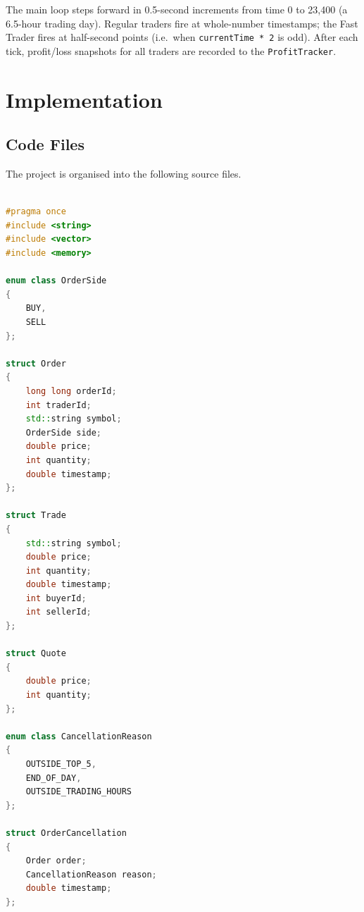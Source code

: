 \documentclass[11pt, a4paper]{article}
\begin{document}
The main loop steps forward in 0.5-second increments from time 0 to 23,400 (a 6.5-hour trading day). Regular traders fire at whole-number timestamps; the Fast Trader fires at half-second points (i.e.\ when \texttt{currentTime * 2} is odd). After each tick, profit/loss snapshots for all traders are recorded to the \texttt{ProfitTracker}.

\section{Implementation}

\subsection{Code Files}

The project is organised into the following source files.

\begin{tcolorbox}[codefile, title={\texttt{Common.h}}]
\begin{lstlisting}[language=C++, numbers=none, caption={}]

#pragma once
#include <string>
#include <vector>
#include <memory>

enum class OrderSide
{
    BUY,
    SELL
};

struct Order
{
    long long orderId;
    int traderId;
    std::string symbol;
    OrderSide side;
    double price;
    int quantity;
    double timestamp;
};

struct Trade
{
    std::string symbol;
    double price;
    int quantity;
    double timestamp;
    int buyerId;
    int sellerId;
};

struct Quote
{
    double price;
    int quantity;
};

enum class CancellationReason
{
    OUTSIDE_TOP_5,
    END_OF_DAY,
    OUTSIDE_TRADING_HOURS
};

struct OrderCancellation
{
    Order order;
    CancellationReason reason;
    double timestamp;
};

\end{lstlisting}
\end{tcolorbox}

\vspace{0.6em}
\end{document}
